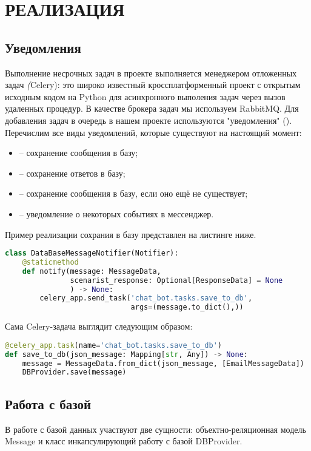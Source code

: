 \section{РЕАЛИЗАЦИЯ}
    \subsection{Уведомления}
    Выполнение несрочных задач в проекте выполняется менеджером отложенных задач \textit(Celery):
    это широко известный кроссплатформенный проект с открытым исходным кодом на Python для
    асинхронного выполения задач через вызов удаленных процедур.
    В качестве брокера задач мы используем RabbitMQ\cite{docs.rabbitmq}.
    Для добавления задач в очередь в нашем проекте используются "уведомления" ().
    Перечислим все виды уведомлений, которые существуют на настоящий момент:
    \begin{itemize}
        \item {} -- сохранение сообщения в базу;
        \item {} -- сохранение ответов в базу;
        \item {} -- сохранение сообщения в базу, если оно ещё не существует;
        \item {} -- уведомление о некоторых событиях в мессенджер.
    \end{itemize}
    Пример реализации сохрания в базу представлен на листинге ниже.
\begin{lstlisting}[language=Python]
class DataBaseMessageNotifier(Notifier):
    @staticmethod
    def notify(message: MessageData,
               scenarist_response: Optional[ResponseData] = None
               ) -> None:
        celery_app.send_task('chat_bot.tasks.save_to_db',
                             args=(message.to_dict(),))
\end{lstlisting}

    Сама Celery-задача выглядит следующим образом:
\begin{lstlisting}[language=Python]
@celery_app.task(name='chat_bot.tasks.save_to_db')
def save_to_db(json_message: Mapping[str, Any]) -> None:
    message = MessageData.from_dict(json_message, [EmailMessageData])
    DBProvider.save(message)
\end{lstlisting}

    \subsection{Работа с базой}
    В работе с базой данных участвуют две сущности: объектно-реляционная модель Message
    и класс инкапсулирующий работу с базой DBProvider.

